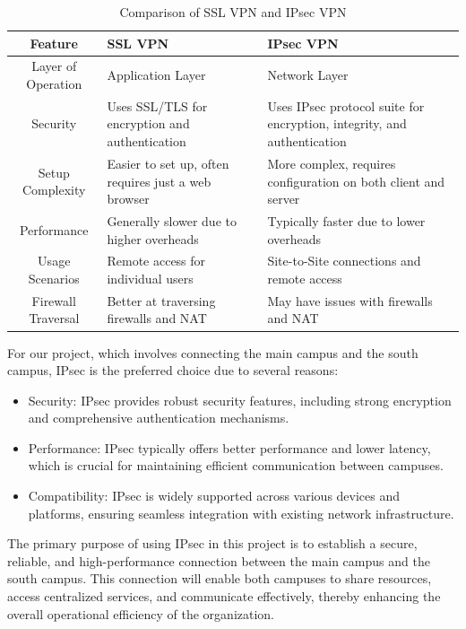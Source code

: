 \documentclass[12pt]{report}
\begin{document}
\begin{table}[h]
    \centering
    \begin{tabular}{|c|p{5cm}|p{5cm}|}
    \hline
    \textbf{Feature} & \textbf{SSL VPN} & \textbf{IPsec VPN} \\ \hline
    Layer of Operation & Application Layer & Network Layer \\ \hline
    Security & Uses SSL/TLS for encryption and authentication & Uses IPsec protocol suite for encryption, integrity, and authentication \\ \hline
    Setup Complexity & Easier to set up, often requires just a web browser & More complex, requires configuration on both client and server \\ \hline
    Performance & Generally slower due to higher overheads & Typically faster due to lower overheads \\ \hline
    Usage Scenarios & Remote access for individual users & Site-to-Site connections and remote access \\ \hline
    Firewall Traversal & Better at traversing firewalls and NAT & May have issues with firewalls and NAT \\ \hline
    \end{tabular}
    \caption{Comparison of SSL VPN and IPsec VPN}
    \label{tab:vpns}
\end{table}
For our project, which involves connecting the main campus and the south campus, IPsec is the preferred choice due to several reasons:
\begin{itemize}
    \item Security: IPsec provides robust security features, including strong encryption and comprehensive authentication mechanisms.
    \item Performance: IPsec typically offers better performance and lower latency, which is crucial for maintaining efficient communication between campuses.
    \item Compatibility: IPsec is widely supported across various devices and platforms, ensuring seamless integration with existing network infrastructure.
\end{itemize}
The primary purpose of using IPsec in this project is to establish a secure, reliable, and high-performance connection between the main campus and the south campus. This connection will enable both campuses to share resources, access centralized services, and communicate effectively, thereby enhancing the overall operational efficiency of the organization.
\end{document}
